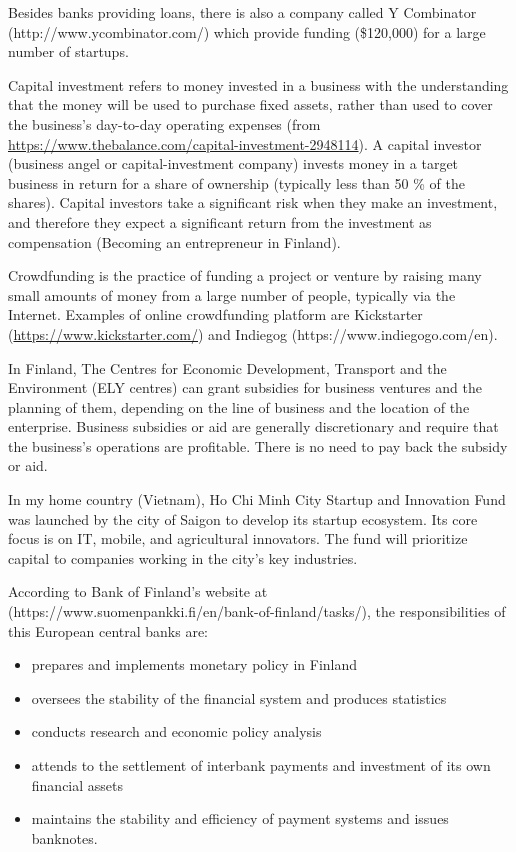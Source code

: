 \documentclass[12pt]{article}
\begin{document}
Besides banks providing loans, there is also a company called Y Combinator (http://www.ycombinator.com/) which provide funding (\$120,000) for a large number of startups.

Capital investment refers to money invested in a business with the understanding that the money will be used to purchase fixed assets, rather than used to cover the business's day-to-day operating expenses (from \url{https://www.thebalance.com/capital-investment-2948114}). A capital investor (business angel or capital-investment company) invests money in a target business in return for a share of ownership (typically less than 50 \% of the shares). Capital investors take a significant risk when they make an investment, and therefore they expect a significant return from the investment as compensation (Becoming an entrepreneur in Finland).

Crowdfunding is the practice of funding a project or venture by raising many small amounts of money from a large number of people, typically via the Internet. Examples of online crowdfunding platform are Kickstarter (\url{https://www.kickstarter.com/}) and Indiegog (https://www.indiegogo.com/en).

In Finland, The Centres for Economic Development, Transport and the Environment (ELY centres) can grant subsidies for business ventures and the planning of them, depending on the line of business and the location of the enterprise. Business subsidies or aid are generally discretionary and require that the business’s operations are profitable. There is no need to pay back the subsidy or aid.

In my home country (Vietnam), Ho Chi Minh City Startup and Innovation Fund was launched by the city of Saigon to develop its startup ecosystem. Its core focus is on IT, mobile, and agricultural innovators. The fund will prioritize capital to companies working in the city’s key industries.

According to Bank of Finland's website at (https://www.suomenpankki.fi/en/bank-of-finland/tasks/), the responsibilities of this European central banks are:

\begin{itemize}
	\item{prepares and implements monetary policy in Finland}
	\item{oversees the stability of the financial system and produces statistics}
	\item{conducts research and economic policy analysis}
	\item{attends to the settlement of interbank payments and investment of its own financial assets}
	\item{maintains the stability and efficiency of payment systems and issues banknotes.}
\end{itemize}
\end{document}
